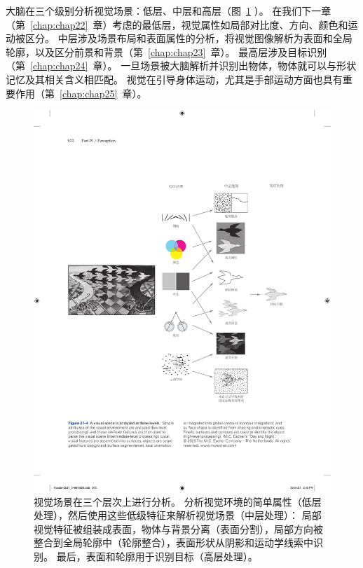 大脑在三个级别分析视觉场景：低层、中层和高层（图~\ref{fig:21_4} ）。
在我们下一章（第~\ref{chap:chap22}~章）考虑的最低层，视觉属性如局部对比度、方向、颜色和运动被区分。
中层涉及场景布局和表面属性的分析，将视觉图像解析为表面和全局轮廓，以及区分前景和背景（第~\ref{chap:chap23}~章）。
最高层涉及目标识别（第~\ref{chap:chap24}~章）。
一旦场景被大脑解析并识别出物体，物体就可以与形状记忆及其相关含义相匹配。
视觉在引导身体运动，尤其是手部运动方面也具有重要作用（第~\ref{chap:chap25}~章）。


\begin{figure}[htbp]
	\centering
	\includegraphics[width=1.0\linewidth]{chap21/fig_21_4}
	\caption{视觉场景在三个层次上进行分析。
		分析视觉环境的简单属性（低层处理），然后使用这些低级特征来解析视觉场景（中层处理）：
		局部视觉特征被组装成表面，物体与背景分离（表面分割），局部方向被整合到全局轮廓中（轮廓整合），表面形状从阴影和运动学线索中识别。
		最后，表面和轮廓用于识别目标（高层处理）。}
	\label{fig:21_4}
\end{figure}


